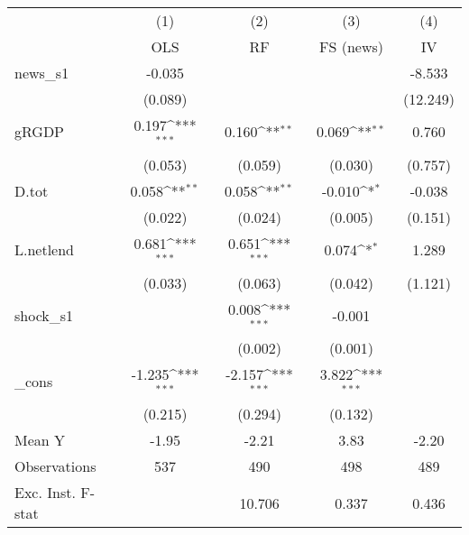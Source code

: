 {
\def\sym#1{\ifmmode^{#1}\else\(^{#1}\)\fi}
\begin{tabular}{l*{4}{c}}
\toprule
            &\multicolumn{1}{c}{(1)}&\multicolumn{1}{c}{(2)}&\multicolumn{1}{c}{(3)}&\multicolumn{1}{c}{(4)}\\
            &\multicolumn{1}{c}{OLS}&\multicolumn{1}{c}{RF}&\multicolumn{1}{c}{FS (news)}&\multicolumn{1}{c}{IV}\\
\midrule
news\_s1     &      -0.035         &                     &                     &      -8.533         \\
            &     (0.089)         &                     &                     &    (12.249)         \\
\addlinespace
gRGDP       &       0.197\sym{***}&       0.160\sym{**} &       0.069\sym{**} &       0.760         \\
            &     (0.053)         &     (0.059)         &     (0.030)         &     (0.757)         \\
\addlinespace
D.tot       &       0.058\sym{**} &       0.058\sym{**} &      -0.010\sym{*}  &      -0.038         \\
            &     (0.022)         &     (0.024)         &     (0.005)         &     (0.151)         \\
\addlinespace
L.netlend   &       0.681\sym{***}&       0.651\sym{***}&       0.074\sym{*}  &       1.289         \\
            &     (0.033)         &     (0.063)         &     (0.042)         &     (1.121)         \\
\addlinespace
shock\_s1    &                     &       0.008\sym{***}&      -0.001         &                     \\
            &                     &     (0.002)         &     (0.001)         &                     \\
\addlinespace
\_cons      &      -1.235\sym{***}&      -2.157\sym{***}&       3.822\sym{***}&                     \\
            &     (0.215)         &     (0.294)         &     (0.132)         &                     \\
\midrule
Mean Y      &       -1.95         &       -2.21         &        3.83         &       -2.20         \\
Observations&         537         &         490         &         498         &         489         \\
Exc. Inst. F-stat&                     &      10.706         &       0.337         &       0.436         \\
\bottomrule
\end{tabular}
}
